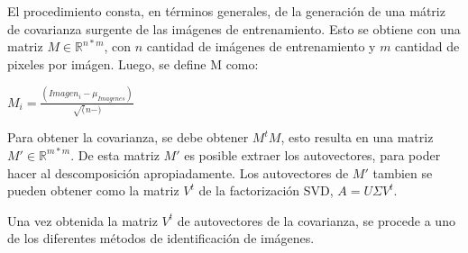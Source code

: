 El procedimiento consta, en t\'erminos generales, de la generaci\'on de una m\'atriz de covarianza surgente 
de las im\'agenes de entrenamiento. Esto se obtiene con una matriz $M \in \mathbb{R}^{n * m}$, con $n$ cantidad
de im\'agenes de entrenamiento y $m$ cantidad de pixeles por im\'agen. Luego, se define M como:

$M_i = \frac{(Imagen_i - \mu_{Imagenes})}{\sqrt(n-)}$

Para obtener la covarianza, se debe obtener $M^t M$, esto resulta en una matriz $M' \in \mathbb{R}^{m * m}$.
De esta matriz $M'$ es posible extraer los autovectores, para poder hacer al descomposici\'on apropiadamente.
Los autovectores de $M'$ tambien se pueden obtener como la matriz $V^t$ de la factorizaci\'on SVD, $A=U\Sigma V^t$.

Una vez obtenida la matriz $V^t$ de autovectores de la covarianza, se procede a uno de los diferentes m\'etodos de
identificaci\'on de im\'agenes.
